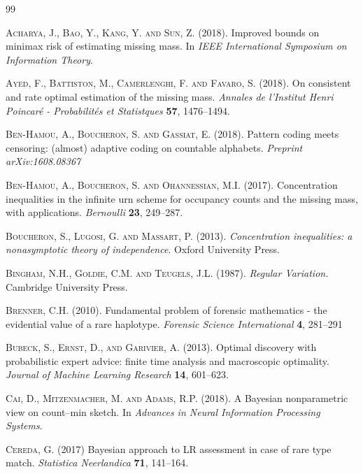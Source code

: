 \documentclass{article}
\newcommand{\1}{\boldsymbol{1}}
\theoremstyle{plain}
\begin{document}

\begin{thebibliography}{99}

\textsc{Acharya, J., Bao, Y., Kang, Y. and Sun, Z.} (2018). Improved bounds on minimax risk of estimating missing mass. In \textit{IEEE International Symposium on Information Theory}.

\textsc{Ayed, F., Battiston, M., Camerlenghi, F. and Favaro, S.} (2018). On consistent and rate optimal estimation of the missing mass. \textit{Annales de l'Institut Henri Poincar\'e - Probabilit\'es et Statistques} \textbf{57}, 1476--1494.  

\textsc{Ben-Hamou, A., Boucheron, S. and Gassiat, E.} (2018). Pattern coding meets censoring: (almost) adaptive coding on countable alphabets. \textit{Preprint arXiv:1608.08367}

\textsc{Ben-Hamou, A., Boucheron, S. and Ohannessian, M.I.} (2017). Concentration inequalities in the infinite urn scheme for occupancy counts and the missing mass, with applications. \textit{Bernoulli} \textbf{23}, 249--287.

\textsc{Boucheron, S., Lugosi, G. and Massart, P.} (2013). \textit{Concentration inequalities: a nonasymptotic theory of independence}. Oxford University Press.

\textsc{Bingham, N.H., Goldie, C.M. and Teugels, J.L.} (1987). \textit{Regular Variation.} Cambridge University Press.

\textsc{Brenner, C.H.} (2010). Fundamental problem of forensic mathematics - the evidential value of a rare haplotype. \textit{Forensic Science International} \textbf{4}, 281--291

\textsc{Bubeck, S., Ernst, D., and Garivier, A.} (2013). Optimal discovery with probabilistic  expert  advice:  finite  time  analysis  and  macroscopic optimality. \textit{Journal of Machine Learning Research} \textbf{14}, 601--623.

\textsc{Cai, D., Mitzenmacher, M. and Adams, R.P.} (2018). A Bayesian nonparametric view on count--min sketch. In \textit{Advances in Neural Information Processing Systems}.

\textsc{Cereda, G.} (2017) Bayesian approach to LR assessment in case of rare type match. \textit{Statistica Neerlandica} \textbf{71}, 141--164.


\end{thebibliography}
\end{document}
